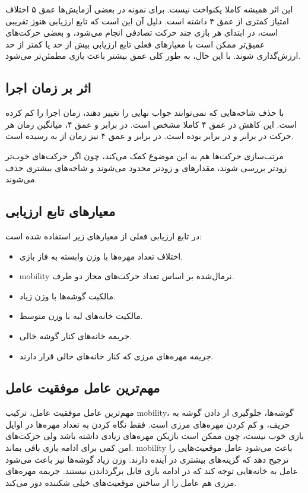 \documentclass[10.5pt]{exam}
\begin{document}
این اثر همیشه کاملا یکنواخت نیست. برای نمونه در بعضی آزمایش‌ها عمق ۵ اختلاف امتیاز کمتری از عمق ۴ داشته است. دلیل آن این است که تابع ارزیابی هنوز تقریبی است، در ابتدای هر بازی چند حرکت تصادفی انجام می‌شود، و بعضی حرکت‌های عمیق‌تر ممکن است با معیارهای فعلی تابع ارزیابی بیش از حد یا کمتر از حد ارزش‌گذاری شوند. با این حال، به طور کلی عمق بیشتر باعث بازی مطمئن‌تر می‌شود.

\subsection{اثر  بر زمان اجرا}
با حذف شاخه‌هایی که نمی‌توانند جواب نهایی را تغییر دهند، زمان اجرا را کم کرده است. این کاهش در عمق ۴ کاملا مشخص است. در برابر
و عمق ۴، میانگین زمان هر حرکت در
برابر
و در
برابر
بوده است. در برابر
و عمق ۴ نیز زمان از
به
رسیده است.

مرتب‌سازی حرکت‌ها هم به این موضوع کمک می‌کند، چون اگر حرکت‌های خوب‌تر زودتر بررسی شوند، مقدارهای
و
زودتر محدود می‌شوند و شاخه‌های بیشتری حذف می‌شوند.

\subsection{معیارهای تابع ارزیابی}
در تابع ارزیابی فعلی از معیارهای زیر استفاده شده است:

\begin{itemize}
    \item اختلاف تعداد مهره‌ها با وزن وابسته به فاز بازی.
    \item mobility نرمال‌شده بر اساس تعداد حرکت‌های مجاز دو طرف.
    \item مالکیت گوشه‌ها با وزن زیاد.
    \item مالکیت خانه‌های لبه با وزن متوسط.
    \item جریمه خانه‌های کنار گوشه خالی.
    \item جریمه مهره‌های مرزی که کنار خانه‌های خالی قرار دارند.
\end{itemize}

\subsection{مهم‌ترین عامل موفقیت عامل}
مهم‌ترین عامل موفقیت عامل، ترکیب mobility، گوشه‌ها، جلوگیری از دادن گوشه به حریف، و کم کردن مهره‌های مرزی است. فقط نگاه کردن به تعداد مهره‌ها در اوایل بازی خوب نیست، چون ممکن است بازیکن مهره‌های زیادی داشته باشد ولی حرکت‌های امن کمی برای ادامه بازی باقی بماند. mobility باعث می‌شود عامل موقعیت‌هایی را ترجیح دهد که گزینه‌های بیشتری در آینده دارند. وزن زیاد گوشه‌ها نیز باعث می‌شود عامل به خانه‌هایی توجه کند که در ادامه بازی قابل برگرداندن نیستند. جریمه مهره‌های مرزی هم عامل را از ساختن موقعیت‌های خیلی شکننده دور می‌کند.
\end{document}
